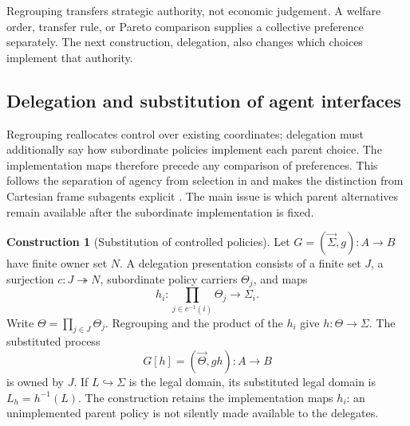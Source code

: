 \documentclass[11pt,a4paper]{article}
\numberwithin{equation}{section}
\theoremstyle{definition}
\newtheorem{construction}[construction]{Construction}
\theoremstyle{remark}
\theoremstyle{plain}
\begin{document}
Regrouping transfers strategic authority, not economic judgement.
A welfare order, transfer rule, or Pareto comparison supplies a collective
preference separately. The next construction, delegation, also changes
which choices implement that authority.

\subsection{Delegation and substitution of agent interfaces}
\label{sec:egt-delegation}

Regrouping reallocates control over existing coordinates; delegation
must additionally say how subordinate policies implement each parent
choice. The implementation maps therefore precede any comparison of
preferences. This follows the separation of agency from selection in
\citet{CapucciEtAl2022Agency} and makes the distinction from Cartesian
frame subagents explicit \citep{GarrabrantEtAl2021CartesianFrames}.
The main issue is which parent alternatives remain available after the
subordinate implementation is fixed.

\begin{construction}[Substitution of controlled policies]
\label{con:egt-agent-substitution}
Let $G=(\vec\Sigma,g):A\to B$ have finite owner set $N$.
A delegation presentation consists of a finite set $J$, a surjection
$c:J\twoheadrightarrow N$, subordinate policy carriers $\Theta_j$, and maps
\[
 h_i:\prod_{j\in c^{-1}(i)}\Theta_j\longrightarrow\Sigma_i.
\]
Write $\Theta=\prod_{j\in J}\Theta_j$. Regrouping and the product of the
$h_i$ give $h:\Theta\to\Sigma$. The substituted process
\[
 G[h]=(\vec\Theta,gh):A\to B
\]
is owned by $J$. If $L\hookrightarrow\Sigma$ is the legal domain, its
substituted legal domain is $L_h=h^{-1}(L)$.
The construction retains the implementation maps $h_i$: an unimplemented
parent policy is not silently made available to the delegates.
\end{construction}
\end{document}
